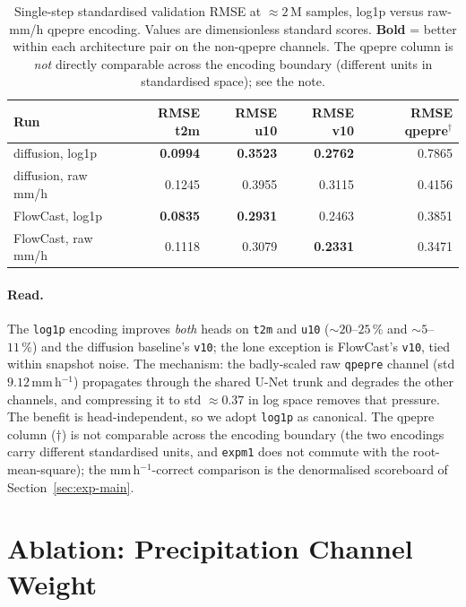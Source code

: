 \begin{table}[htbp]
  \centering
  \caption[log1p versus raw-mm/h encoding ablation]{Single-step standardised validation RMSE at $\approx 2\,\text{M}$ samples, log1p versus raw-mm/h qpepre encoding. Values are dimensionless standard scores. \textbf{Bold} = better within each architecture pair on the non-qpepre channels. The qpepre column is \emph{not} directly comparable across the encoding boundary (different units in standardised space); see the note.}
  \label{tab:log1p}
  \small
  \begin{tabular}{lrrrr}
    \toprule
    Run & RMSE t2m & RMSE u10 & RMSE v10 & RMSE qpepre$^\dagger$ \\
    \midrule
    diffusion, log1p    & \textbf{0.0994} & \textbf{0.3523} & \textbf{0.2762} & 0.7865 \\
    diffusion, raw mm/h & 0.1245 & 0.3955 & 0.3115 & 0.4156 \\
    FlowCast, log1p     & \textbf{0.0835} & \textbf{0.2931} & 0.2463 & 0.3851 \\
    FlowCast, raw mm/h  & 0.1118 & 0.3079 & \textbf{0.2331} & 0.3471 \\
    \bottomrule
  \end{tabular}
\end{table}

\paragraph{Read.} The \texttt{log1p} encoding improves \emph{both} heads on \texttt{t2m} and \texttt{u10} ($\sim$$20$--$25\,\%$ and $\sim$$5$--$11\,\%$) and the diffusion baseline's \texttt{v10}; the lone exception is FlowCast's \texttt{v10}, tied within snapshot noise. The mechanism: the badly-scaled raw \texttt{qpepre} channel (std $9.12$\,mm\,h$^{-1}$) propagates through the shared U-Net trunk and degrades the other channels, and compressing it to std $\approx 0.37$ in log space removes that pressure. The benefit is head-independent, so we adopt \texttt{log1p} as canonical. The qpepre column ($\dagger$) is not comparable across the encoding boundary (the two encodings carry different standardised units, and \texttt{expm1} does not commute with the root-mean-square); the mm\,h$^{-1}$-correct comparison is the denormalised scoreboard of Section~\ref{sec:exp-main}.

\section{Ablation: Precipitation Channel Weight}
\label{sec:exp-qpw}

